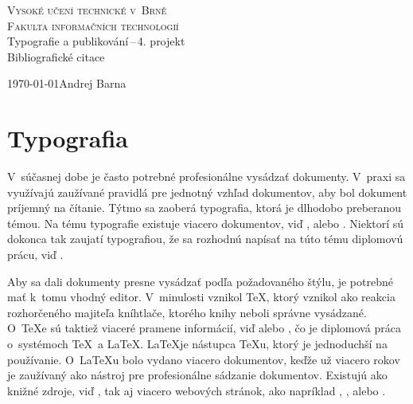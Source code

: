\documentclass[11pt,a4paper]{article}
\begin{document}
\begin{titlepage}
\begin{center}
\Huge
\textsc{Vysoké učení technické v~Brně\\
\huge Fakulta informačních technologií}\\
\LARGE Typografie a publikování\,--\,4. projekt\\
\Huge Bibliografické citace
\end{center}
\Large \today\hfill Andrej Barna
\end{titlepage}

\section*{Typografia}

V~súčasnej dobe je často potrebné profesionálne vysádzať dokumenty. V~praxi sa využívajú zaužívané pravidlá pre jednotný vzhľad dokumentov, aby bol dokument príjemný na čítanie. Týtmo sa zaoberá typografia, ktorá je dlhodobo preberanou témou. Na tému typografie existuje viacero dokumentov, viď \citep{JBerry}, alebo \citep{Hausmann}. Niektorí sú dokonca tak zaujatí typografiou, že sa rozhodnú napísať na túto tému diplomovú prácu, viď \citep{JanciK}.

Aby sa dali dokumenty presne vysádzať podľa požadovaného štýlu, je potrebné mať k~tomu vhodný editor. V~minulosti vznikol \TeX, ktorý vznikol ako reakcia rozhorčeného majiteľa kníhtlače, ktorého knihy neboli správne vysádzané. O~\TeX e sú taktiež viaceré pramene informácií, viď \citep{OlsakP} alebo \citep{BunkaR}, čo je diplomová práca o~systémoch \TeX\ a \LaTeX. \LaTeX je nástupca \TeX u, ktorý je jednoduchší na používanie. O~\LaTeX u bolo vydano viacero dokumentov, keďže už viacero rokov je zaužívaný ako nástroj pre profesionálne sádzanie dokumentov. Existujú ako knižné zdroje, viď \citep{GoosensM}, tak aj viacero webových stránok, ako napríklad \citep{SvambM}, \citep{TaraD}, alebo \citep{Peng}.

\newpage
\renewcommand{\refname}{Literatúra}


\end{document}

